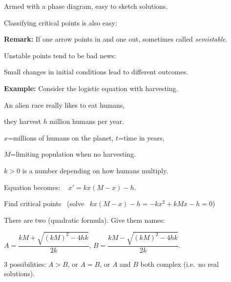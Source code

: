 \documentclass[10pt,aspectratio=169]{beamer}
\begin{document}
\begin{frame}
Armed with a phase diagram, easy to sketch solutions.

\vspace*{3.2in}

\end{frame}

\begin{frame}
Classifying critical points is also easy:

\medskip


\medskip
\pause

\textbf{Remark:} If one arrow points in and one out, sometimes called
\emph{semistable}.

\medskip
\pause

Unstable points tend to be bad news:

\pause
Small changes in initial conditions lead to different outcomes.

\end{frame}

\begin{frame}
\textbf{Example:}
Consider the logistic equation with harvesting.

\pause
An alien race really likes to eat humans,

\pause
they harvest $h$ million humans per year.

\pause

$x$=millions of humans on the planet,
\pause
$t$=time in years,

\pause
$M$=limiting population when no harvesting.

\pause
$k > 0$ is a number depending on how humans multiply.

\medskip
\pause

Equation becomes: ~
$x' = kx(M-x) - h$.

\medskip
\pause

Find critical points ~(solve~
$kx(M-x) - h = -kx^2+kMx - h  = 0$)

\medskip
\pause

There are two (quadratic formula).  Give them names:

$A = \dfrac{kM + \sqrt{{(kM)}^2 - 4hk}}{2k}$, \qquad
$B = \dfrac{kM - \sqrt{{(kM)}^2 - 4hk}}{2k}$.

\pause
\medskip

$3$ possibilities:
$A > B$, or $A=B$, or $A$ and $B$ both complex
(i.e.\ no real solutions).

\end{frame}
\end{document}
